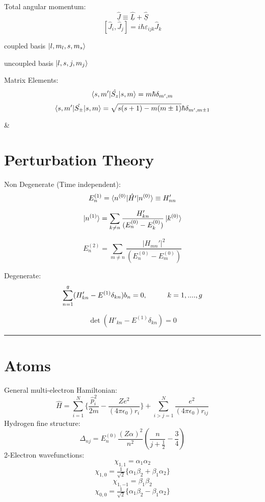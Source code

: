 \documentclass[table,cmyk]{article}
\begin{document}
\begin{longtable}
{\begin{minipage}{7.4cm}
\end{minipage}
}
\vspace{0.3cm}

Total angular momentum:
\[ \hat{\underline{J}} \equiv \hat{\underline{L}}+\hat{\underline{S}}\]
\[[\hat{J}_i,\hat{J}_j] = i\hbar \varepsilon_{ijk}\hat{J}_k\]
\begin{center}
{\centering

coupled basis $\ket{l, m_l, s, m_s}$ 

uncoupled basis $\ket{l, s, j, m_j}$}
\end{center}{}

Matrix Elements:
\[\braket{s,m'|\hat{S_z}|s,m} = m\hbar \delta_{m',m}\]
\[\braket{s,m'|\hat{S_{\pm}}|s,m} = \sqrt{s(s+1)-m(m\pm1)} \hbar \delta_{m',m\pm1}\]

&
\section*{Perturbation Theory}
Non Degenerate (Time independent):
\[E_n^{(1)} = \braket{n^{(0)}|\hat{H'}|n^{(0)}} \equiv H_{nn}'\]

\[ \ket{n^{(1)}} = \sum_{k\ne n} \frac{H_{kn}'}{(E_n^{(0)}-E_k^{(0)})}\ket{k^{(0)}}\]

\[E_n^{(2)} = \sum_{m\ne n} \frac{|H_{mn}'|^2}{(E_n^{(0)}-E_m^{(0)})}\]

Degenerate:
\[ \sum_{n=1}^{g} (H'_{kn} - E^{(1)}\delta_{kn})b_n=0, \text{\hspace{1cm}} k = 1,....,g\]

\[\det(H'_{kn} - E^{(1)}\delta_{kn}) = 0\]

\noindent\rule{7.8cm}{0.4pt}

\section*{Atoms}


General multi-electron Hamiltonian:
\[\hat{H} = \sum_{i=1}^{N} \Big\{ \frac{\hat{p}_i^2}{2m}-\frac{Ze^2}{(4\pi\epsilon_0)r_i}\Big\} + \sum_{i>j=1}^{N} \frac{e^2}{(4\pi\epsilon_0)r_{ij}}\]
Hydrogen fine structure:
\[\Delta_{nj} = E^{(0)}_n \frac{(Z\alpha)^2}{n^2}\left( \frac{n}{j+\tfrac{1}{2}}-\frac{3}{4}\right)\]
2-Electron wavefunctions:
\[\chi_{1,1} = \alpha_1\alpha_2\]
\[\chi_{1,0} = \tfrac{1}{\sqrt{2}}\{\alpha_1\beta_2+\beta_1\alpha_2\}\]
\[\chi_{1,-1} = \beta_1\beta_2\]
\[\chi_{0,0} = \tfrac{1}{\sqrt{2}}\{\alpha_1\beta_2-\beta_1\alpha_2\}\]


\tabularnewline\hline

\end{longtable}
\end{document}
